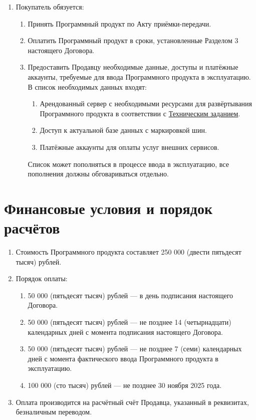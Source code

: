 \documentclass[12pt]{article}
\newcommand{\TZ}[1][Техническое задание]{\hyperref[link-tz]{#1}}
\begin{document}
\begin{enumerate}
    \item Покупатель обязуется:
          \begin{enumerate}
              \item Принять Программный продукт по Акту приёмки-передачи.
              \item Оплатить Программный продукт в сроки, установленные Разделом 3 настоящего Договора.
              \item Предоставить Продавцу необходимые данные, доступы и платёжные аккаунты, требуемые для ввода Программного продукта в эксплуатацию. В список необходимых данных входят:
                    \begin{enumerate}
                        \item Арендованный сервер с необходимыми ресурсами для развёртывания Программного продукта в соответствии с \TZ[Техническим заданием].
                        \item Доступ к актуальной базе данных с маркировкой шин.
                        \item Платёжные аккаунты для оплаты услуг внешних сервисов.
                    \end{enumerate}
                    Список может пополняться в процессе ввода в эксплуатацию, все пополнения должны обговариваться отдельно.
          \end{enumerate}
\end{enumerate}

\section{Финансовые условия и порядок расчётов}

\begin{enumerate}
    \item Стоимость Программного продукта составляет 250 000 (двести пятьдесят тысяч) рублей.
    \item Порядок оплаты:
          \begin{enumerate}
              \item 50 000 (пятьдесят тысяч) рублей — в день подписания настоящего Договора.
              \item 50 000 (пятьдесят тысяч) рублей — не позднее 14 (четырнадцати) календарных дней с момента подписания настоящего Договора.
              \item 50 000 (пятьдесят тысяч) рублей — не позднее 7 (семи) календарных дней с момента фактического ввода Программного продукта в эксплуатацию.
              \item 100 000 (сто тысяч) рублей — не позднее 30 ноября 2025 года.
          \end{enumerate}
    \item Оплата производится на расчётный счёт Продавца, указанный в реквизитах, безналичным переводом.
\end{enumerate}
\end{document}
